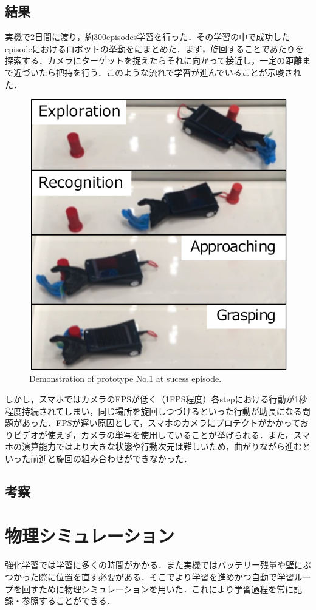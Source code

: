 \subsection{結果}
実機で2日間に渡り，約300episodes学習を行った．その学習の中で成功したepisodeにおけるロボットの挙動をにまとめた．まず，旋回することであたりを探索する．カメラにターゲットを捉えたらそれに向かって接近し，一定の距離まで近づいたら把持を行う．このような流れで学習が進んでいることが示唆された．

\begin{figure}[H]
    \centering
    \includegraphics[width=0.7\linewidth]{figure/chapter3/robothand-v1_demo}
    \caption{Demonstration of prototype No.1 at sucess episode.}
    \label{fig:1号機例}
\end{figure}

しかし，スマホではカメラのFPSが低く（1FPS程度）各stepにおける行動が1秒程度持続されてしまい，同じ場所を旋回しつづけるといった行動が助長になる問題があった．FPSが遅い原因として，スマホのカメラにプロテクトがかかっておりビデオが使えず，カメラの単写を使用していることが挙げられる．また，スマホの演算能力ではより大きな状態や行動次元は難しいため，曲がりながら進むといった前進と旋回の組み合わせができなかった．

\subsection{考察}

\section{物理シミュレーション}
強化学習では学習に多くの時間がかかる．また実機ではバッテリー残量や壁にぶつかった際に位置を直す必要がある．そこでより学習を進めかつ自動で学習ループを回すために物理シミュレーションを用いた．これにより学習過程を常に記録・参照することができる．

